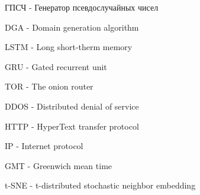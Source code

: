 \noindent ГПСЧ - Генератор псевдослучайных чисел

\noindent DGA - Domain generation algorithm

\noindent LSTM - Long short-therm memory

\noindent GRU - Gated recurrent unit

\noindent TOR - The onion router

\noindent DDOS - Distributed denial of service

\noindent HTTP - HyperText transfer protocol

\noindent IP - Internet protocol

\noindent GMT - Greenwich mean time

\noindent t-SNE - t-distributed stochastic neighbor embedding
\clearpage
